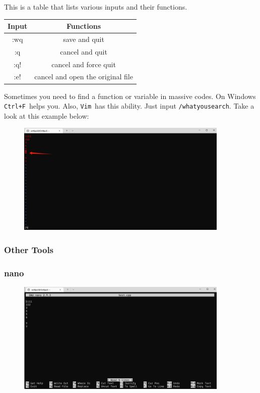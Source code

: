 \documentclass[12pt]{ctexart}
\begin{document}
This is a table that lists various inputs and their functions.

\begin{table}[H]
    \centering
    \begin{tabular}{cc}
    \toprule
    Input & Functions \\
    \midrule
    :wq & save and quit \\
    :q & cancel and quit \\
    :q! & cancel and force quit \\
    :e! & cancel and open the original file \\
    \bottomrule
    \end{tabular}
\end{table}

Sometimes you need to find a function or variable in massive codes. On
Windows \texttt{Ctrl+F}\ helps you. Also, \texttt{Vim}\ has this ability.
Just input \texttt{/whatyousearch}. Take a look at this example below:

\begin{figure}[H]
    \centering
    \includegraphics[width=0.9\textwidth,keepaspectratio]{assets/Linux/1.3 How to edit files on Linux/4.png}
\end{figure}

\subsubsection{\textbf{Other Tools}}

\subsubsection*{\textbf{nano}}

\begin{figure}[H]
    \centering
    \includegraphics[width=0.9\textwidth,keepaspectratio]{assets/Linux/1.3 How to edit files on Linux/5.png}
\end{figure}
\end{document}
